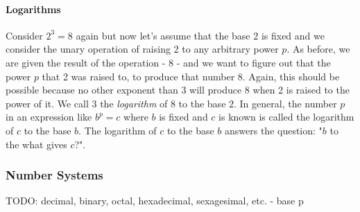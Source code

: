 \paragraph{Logarithms}
Consider $2^3 = 8$ again but now let's assume that the base 2 is fixed and we consider the unary operation of raising 2 to any arbitrary power $p$. As before, we are given the result of the operation - 8 - and we want to figure out that the power $p$ that 2 was raised to, to produce that number 8. Again, this should be possible because no other exponent than 3 will produce 8 when 2 is raised to the power of it. We call $3$ the \emph{logarithm} of $8$ to the base $2$. In general, the number $p$ in an expression like $b^p = c$ where $b$ is fixed and $c$ is known is called the logarithm of $c$ to the base $b$. The logarithm of $c$ to the base $b$ answers the question: "$b$ to the what gives $c$?".




\subsubsection{Number Systems}
TODO: decimal, binary, octal, hexadecimal, sexagesimal, etc. - base p


